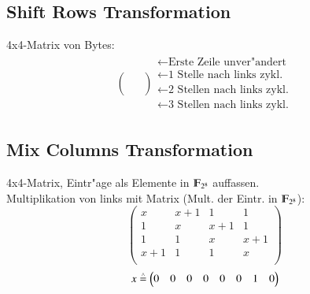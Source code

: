 \subsection{Shift Rows Transformation}
4x4-Matrix von Bytes: 
\begin{align*}
	&\begin{pmatrix}
		& \\
		& \\
		& \\ 
		& \\
	\end{pmatrix}
	\begin{matrix}
		\leftarrow \text{Erste Zeile unver"andert}\\
		\leftarrow \text{1 Stelle nach links zykl.}\\
		\leftarrow \text{2 Stellen nach links zykl.}\\
		\leftarrow \text{3 Stellen nach links zykl.}
	\end{matrix}&
\end{align*}	


\subsection{Mix Columns Transformation}
4x4-Matrix, Eintr"age als Elemente in $\F_{2^8}$ auffassen.\\
Multiplikation von links mit Matrix
(Mult. der Eintr. in $\F_{2^8}$):
\[
	\begin{pmatrix}
		x & x+1 & 1 & 1\\
		1 & x & x+1 & 1\\
		1 & 1 & x & x+1\\
		x+1 & 1 & 1 & x\\
	\end{pmatrix}
\]	
\[
	x \stackrel{\scriptscriptstyle\wedge}{=}
	\begin{pmatrix}
		0 & 0 & 0 & 0 & 0 & 0 & 1 & 0\\
	\end{pmatrix}
\]

